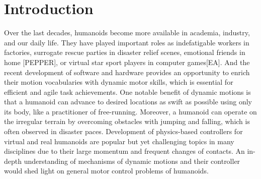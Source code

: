 \chapter{Introduction}
 
Over the last decades, humanoids become more available in academia,
industry, and our daily life.
They have played important roles as indefatigable workers in factories,
surrogate rescue parties in disaster relief scenes,
emotional friends in home [PEPPER],
or virtual star sport players in computer games[EA].
And the recent development of software and hardware provides
an opportunity to enrich their motion vocabularies with dynamic motor skills,
which is essential for efficient and agile task achievements.
One notable benefit of dynamic motions is that a humanoid can advance to
desired locations as swift as possible using only its body,
like a practitioner of free-running.
Moreover, a humanoid can operate on the irregular terrain by overcoming
obstacles with jumping and falling, which is often observed in disaster
paces.
Development of physics-based controllers for virtual and real
humanoids are popular but yet challenging topics in many disciplines
due to their large momentum and frequent changes of contacts.
An in-depth understanding of mechanisms of dynamic motions and 
their controller would shed light on general motor control problems
of humanoids.


